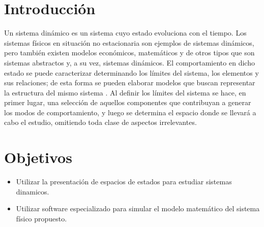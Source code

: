\documentclass{article}
\begin{document}

\tableofcontents %

\section{Introducción}
Un sistema dinámico es un sistema cuyo estado evoluciona con el tiempo. Los sistemas físicos en situación no estacionaria son ejemplos de sistemas dinámicos, pero también existen modelos económicos, matemáticos y de otros tipos que son sistemas abstractos y, a su vez, sistemas dinámicos. El comportamiento en dicho estado se puede caracterizar determinando los límites del sistema, los elementos y sus relaciones; de esta forma se pueden elaborar modelos que buscan representar la estructura del mismo sistema \cite{albalooshi2003virtual}.
Al definir los límites del sistema se hace, en primer lugar, una selección de aquellos componentes que contribuyan a generar los modos de comportamiento, y luego se determina el espacio donde se llevará a cabo el estudio, omitiendo toda clase de aspectos irrelevantes. 

\lipsum[2-3]

\section{Objetivos}
\begin{itemize}
  \item Utilizar la presentación de espacios de estados para estudiar sistemas dinamicos.
  \item Utilizar software especializado para simular el modelo matemático del sistema físico propuesto.
\end{itemize}
\end{document}
